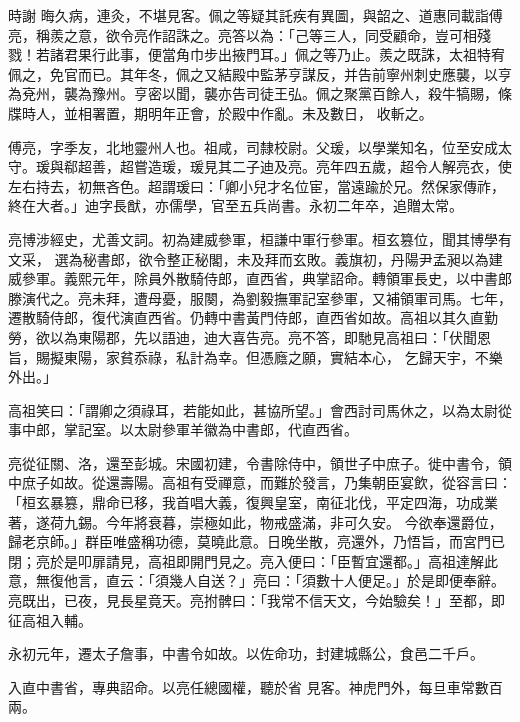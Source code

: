 \begin{pinyinscope}
 時謝
 晦久病，連灸，不堪見客。佩之等疑其託疾有異圖，與韶之、道惠同載詣傅亮，稱羨之意，欲令亮作詔誅之。亮答以為：「己等三人，同受顧命，豈可相殘戮！若諸君果行此事，便當角巾步出掖門耳。」佩之等乃止。羨之既誅，太祖特宥佩之，免官而已。其年冬，佩之又結殿中監茅亨謀反，并告前寧州刺史應襲，以亨為兗州，襲為豫州。亨密以聞，襲亦告司徒王弘。佩之聚黨百餘人，殺牛犒賜，條牒時人，並相署置，期明年正會，於殿中作亂。未及數日，
 收斬之。



 傅亮，字季友，北地靈州人也。祖咸，司隸校尉。父瑗，以學業知名，位至安成太守。瑗與郗超善，超嘗造瑗，瑗見其二子迪及亮。亮年四五歲，超令人解亮衣，使左右持去，初無吝色。超謂瑗曰：「卿小兒才名位宦，當遠踰於兄。然保家傳祚，終在大者。」迪字長猷，亦儒學，官至五兵尚書。永初二年卒，追贈太常。



 亮博涉經史，尤善文詞。初為建威參軍，桓謙中軍行參軍。桓玄篡位，聞其博學有文采，
 選為秘書郎，欲令整正秘閣，未及拜而玄敗。義旗初，丹陽尹孟昶以為建威參軍。義熙元年，除員外散騎侍郎，直西省，典掌詔命。轉領軍長史，以中書郎滕演代之。亮未拜，遭母憂，服闋，為劉毅撫軍記室參軍，又補領軍司馬。七年，遷散騎侍郎，復代演直西省。仍轉中書黃門侍郎，直西省如故。高祖以其久直勤勞，欲以為東陽郡，先以語迪，迪大喜告亮。亮不答，即馳見高祖曰：「伏聞恩旨，賜擬東陽，家貧忝祿，私計為幸。但憑廕之願，實結本心，
 乞歸天宇，不樂外出。」



 高祖笑曰：「謂卿之須祿耳，若能如此，甚協所望。」會西討司馬休之，以為太尉從事中郎，掌記室。以太尉參軍羊徽為中書郎，代直西省。



 亮從征關、洛，還至彭城。宋國初建，令書除侍中，領世子中庶子。徙中書令，領中庶子如故。從還壽陽。高祖有受禪意，而難於發言，乃集朝臣宴飲，從容言曰：「桓玄暴篡，鼎命已移，我首唱大義，復興皇室，南征北伐，平定四海，功成業著，遂荷九錫。今年將衰暮，崇極如此，物戒盛滿，非可久安。
 今欲奉還爵位，歸老京師。」群臣唯盛稱功德，莫曉此意。日晚坐散，亮還外，乃悟旨，而宮門已閉；亮於是叩扉請見，高祖即開門見之。亮入便曰：「臣暫宜還都。」高祖達解此意，無復他言，直云：「須幾人自送？」亮曰：「須數十人便足。」於是即便奉辭。亮既出，已夜，見長星竟天。亮拊髀曰：「我常不信天文，今始驗矣！」至都，即征高祖入輔。



 永初元年，遷太子詹事，中書令如故。以佐命功，封建城縣公，食邑二千戶。



 入直中書省，專典詔命。以亮任總國權，聽於省
 見客。神虎門外，每旦車常數百兩。




\end{pinyinscope}
